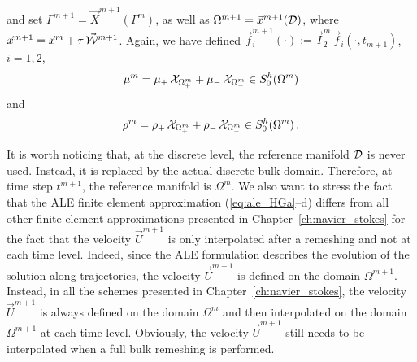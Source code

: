 and set $\Gamma^{m+1} = \vec X^{m+1}(\Gamma^m)$, as well as $\Omega^{m+1} =
\vec x^{m+1}(\mathcal D)$, where $\vec x^{m+1} = \vec x^m + \tau\,\vec{\mathcal W}^{m+1}$. Again, we
have defined $\vec f_i^{m+1}(\cdot) := \vec I^m_2\,\vec f_i(\cdot,t_{m+1})$,
$i=1,2$,
\begin{equation}
\mu^m = \mu_+\,\mathrm{\mathcal{X}}_{\Omega^m_+} + \mu_-\,\mathrm{\mathcal{X}}_{\Omega^m_-}\in
S^h_0(\Omega^m)
\end{equation}
and
\begin{equation}
\rho^m = \rho_+\,\mathrm{\mathcal{X}}_{\Omega^m_+} + \rho_-\,\mathrm{\mathcal{X}}_{\Omega^m_-}\in
S^h_0(\Omega^m)\,.
\end{equation}

It is worth noticing that, at the discrete level, the reference manifold $\mathcal D$
is never used. Instead, it is replaced by the actual discrete bulk domain.
Therefore, at time step $t^{m+1}$, the reference manifold is $\Omega^m$. We
also want to stress the fact that the ALE finite element approximation
(\ref{eq:ale_HGa}--d) differs from all other finite element approximations
presented in Chapter~\ref{ch:navier_stokes} for the fact that the velocity $\vec
U^{m+1}$ is only interpolated after a remeshing and not at each time level.
Indeed, since the ALE formulation describes the evolution of the solution along
trajectories, the velocity $\vec U^{m+1}$ is defined on the domain
$\Omega^{m+1}$. Instead, in all the schemes presented in
Chapter~\ref{ch:navier_stokes}, the velocity $\vec U^{m+1}$ is always defined on
the domain $\Omega^m$ and then interpolated on the domain $\Omega^{m+1}$ at
each time level. Obviously, the velocity $\vec U^{m+1}$ still needs to be
interpolated when a full bulk remeshing is performed.


